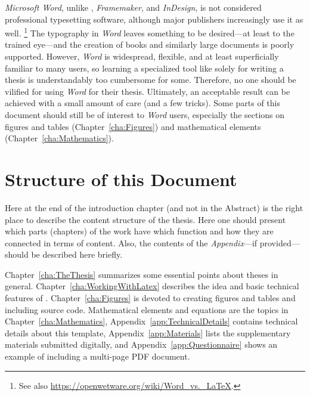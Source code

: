 \emph{Microsoft Word}, unlike \latex, \emph{Framemaker}, and \emph{InDesign},
is not considered professional typesetting software, although major
publishers increasingly use it as well.%
\footnote{See also \url{https://openwetware.org/wiki/Word_vs._LaTeX}.}
The typography in \emph{Word} leaves something to be desired---at least to the
trained eye---and the creation of books and similarly large documents is poorly
supported. However, \emph{Word} is widespread, flexible, and at least
superficially familiar to many users, so learning a specialized tool like \latex
solely for writing a thesis is understandably too cumbersome for some.
Therefore, no one should be vilified for using \emph{Word} for their thesis.
Ultimately, an acceptable result can be achieved with a small amount of care
(and a few tricks). Some parts of this document should still be of interest to
\emph{Word} users, especially the sections on figures and tables
(Chapter~\ref{cha:Figures}) and mathematical elements
(Chapter~\ref{cha:Mathematics}).


\section{Structure of this Document}

Here at the end of the introduction chapter (and not in the Abstract) is the
right place to describe the content structure of the thesis. Here one should
present which parts (chapters) of the work have which function and how they are
connected in terms of content. Also, the contents of the \emph{Appendix}---if
provided---should be described here briefly.

Chapter~\ref{cha:TheThesis} summarizes some essential points about theses in
general. Chapter~\ref{cha:WorkingWithLatex} describes the idea and basic
technical features of \latex. Chapter~\ref{cha:Figures} is devoted to creating
figures and tables and including source code. Mathematical elements and
equations are the topics in Chapter~\ref{cha:Mathematics}, \etc
Appendix~\ref{app:TechnicalDetails} contains technical details about this
template, Appendix~\ref{app:Materials} lists the supplementary materials
submitted digitally, and Appendix~\ref{app:Questionnaire} shows an example of
including a multi-page PDF document.
